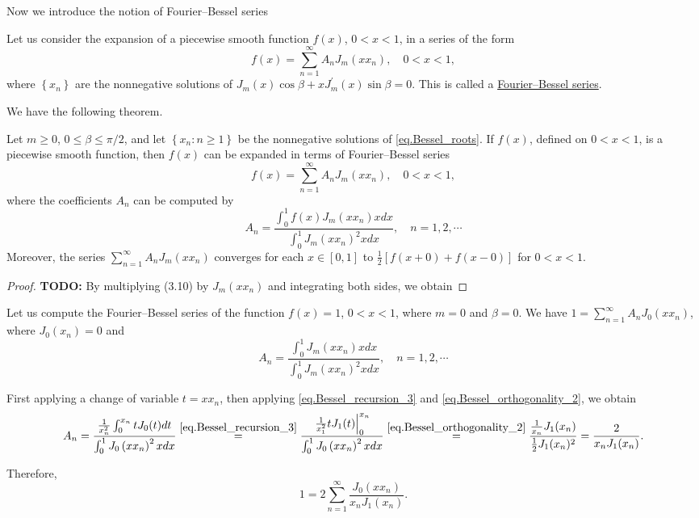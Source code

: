 Now we introduce the notion of Fourier--Bessel series

\begin{definition}
    Let us consider the expansion of a piecewise smooth function $f(x)$, $0<x<1$, in a series of the form
$$
f(x)=\sum_{n=1}^{\infty} A_n J_m\left(x x_n\right), \quad 0<x<1,
$$
where $\left\{x_n\right\}$ are the nonnegative solutions of $J_m(x) \cos \beta+x J_m^{\prime}(x) \sin \beta=0$. This is called a \underline{Fourier--Bessel series}. 
\end{definition}

We have the following theorem.

\begin{theorem}[]
Let $m \geq 0$, $0 \leq \beta \leq \pi / 2$, and let $\left\{x_n: n \geq 1\right\}$ be the nonnegative solutions of \eqref{eq.Bessel_roots}. If $f(x)$, defined on $0<x<1$, is a piecewise smooth function, then $f(x)$ can be expanded in terms of Fourier--Bessel series
$$
    f(x)=\sum_{n=1}^{\infty} A_n J_m\left(x x_n\right), \quad 0<x<1,
$$
where the coefficients $A_n$ can be computed by
$$
    A_n=\frac{\int_0^1 f(x) J_m\left(x x_n\right) x d x}{\int_0^1 J_m\left(x x_n\right)^2 x d x}, \quad n=1,2, \cdots
$$
Moreover, the series $\sum_{n=1}^{\infty} A_n J_m\left(x x_n\right)$ converges for each $x \in[0,1]$ to $\frac{1}{2}[f(x+0)+f(x-0)]$ for $0<x<1$.
\end{theorem}
\begin{proof}
    \textbf{TODO: } By multiplying (3.10) by $J_m\left(x x_n\right)$ and integrating both sides, we obtain
\end{proof}

\begin{example}[]
Let us compute the Fourier--Bessel series of the function $f(x)=1$, $0<x<1$, where $m=0$ and $\beta=0$. We have $1=\sum_{n=1}^{\infty} A_n J_0\left(x x_n\right)$, where $J_0(x_n)=0$ and
$$
A_n=\frac{\int_0^1 J_m\left(x x_n\right) x d x}{\int_0^1 J_m\left(x x_n\right)^2 x d x}, \quad n=1,2, \cdots
$$

First applying a change of variable $t = xx_n$, then applying \eqref{eq.Bessel_recursion_3} and \eqref{eq.Bessel_orthogonality_2}, we obtain
$$
A_n=\frac{\frac{1}{x_n^2} \int_0^{x_n} t J_0(t) d t}{\int_0^1 J_0\left(x x_n\right)^2 x d x}\overset{\eqref{eq.Bessel_recursion_3}}{=}\frac{\left.\frac{1}{x_1^2} t J_1(t)\right|_0 ^{x_n}}{\int_0^1 J_0\left(x x_n\right)^2 x d x}\overset{\eqref{eq.Bessel_orthogonality_2}}{=}\frac{\frac{1}{x_n} J_1(x_n)}{\frac{1}{2} J_1(x_n)^2}=\frac{2}{x_n J_1(x_n)} .
$$

Therefore,
$$
1=2 \sum_{n=1}^{\infty} \frac{J_0\left(x x_n\right)}{x_n J_1(x_n)}.
$$
\end{example}


